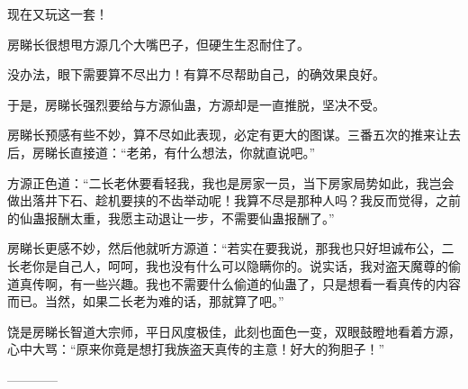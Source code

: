 \begin{this_body}
现在又玩这一套！

房睇长很想甩方源几个大嘴巴子，但硬生生忍耐住了。

没办法，眼下需要算不尽出力！有算不尽帮助自己，的确效果良好。

于是，房睇长强烈要给与方源仙蛊，方源却是一直推脱，坚决不受。

房睇长预感有些不妙，算不尽如此表现，必定有更大的图谋。三番五次的推来让去后，房睇长直接道：“老弟，有什么想法，你就直说吧。”

方源正色道：“二长老休要看轻我，我也是房家一员，当下房家局势如此，我岂会做出落井下石、趁机要挟的不齿举动呢！我算不尽是那种人吗？我反而觉得，之前的仙蛊报酬太重，我愿主动退让一步，不需要仙蛊报酬了。”

房睇长更感不妙，然后他就听方源道：“若实在要我说，那我也只好坦诚布公，二长老你是自己人，呵呵，我也没有什么可以隐瞒你的。说实话，我对盗天魔尊的偷道真传啊，有一些兴趣。我也不需要什么偷道的仙蛊了，只是想看一看真传的内容而已。当然，如果二长老为难的话，那就算了吧。”

饶是房睇长智道大宗师，平日风度极佳，此刻也面色一变，双眼鼓瞪地看着方源，心中大骂：“原来你竟是想打我族盗天真传的主意！好大的狗胆子！”

------------

\end{this_body}

